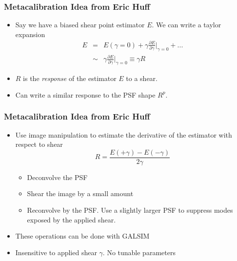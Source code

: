 \documentclass{beamer}
\begin{document}
\frame
{
    \frametitle{Metacalibration Idea from Eric Huff}

 

    {\Large
        \begin{itemize}
            \item Say we have a biased shear point estimator {\color{gold} $E$}.  We can write a taylor expansion
                {\color{mygray}
                    \begin{eqnarray}
                        E & = & E(\gamma=0) + \gamma \frac{\partial E}{\partial \gamma} \bigg|_{\gamma=0} + ... \nonumber \\
                          & \sim &  \gamma \frac{\partial E}{\partial \gamma}\bigg|_{\gamma=0}  \equiv \gamma R \nonumber 
                    \end{eqnarray}
                } 
            \item {\color{gold} $R$} is the {\em response} of the estimator $E$ to a shear.
            \item Can write a similar response to the PSF shape $R^p$.
        \end{itemize}
    }
}

\frame
{
    \frametitle{Metacalibration Idea from Eric Huff}


    \begin{itemize}

        \item Use image manipulation to estimate the derivative of the
            estimator with respect to shear
            {\color{gold}
                \begin{equation}
                    R = \frac{E(+\gamma) - E(-\gamma)}{2 \gamma} \nonumber 
                \end{equation}
            }
            \begin{itemize}
                \item Deconvolve the PSF
                \item Shear the image by a small amount
                \item Reconvolve by the PSF.  Use a slightly larger PSF to suppress
                    modes exposed by the applied shear.
            \end{itemize}

            \item These operations can be done with GALSIM
            \item Insensitive to applied shear $\gamma$.  {\color{lightskyblue} No tunable parameters}


    \end{itemize}

}
\end{document}
